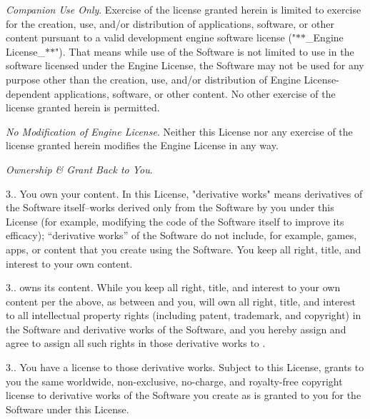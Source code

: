 \begin{DoxyEnumerate}
\item {\itshape {} Companion Use Only}. Exercise of the license granted herein is limited to exercise for the creation, use, and/or distribution of applications, software, or other content pursuant to a valid  development engine software license ("{}\texorpdfstring{$\ast$}{*}\texorpdfstring{$\ast$}{*}\+\_\+\+Engine License\+\_\+\texorpdfstring{$\ast$}{*}\texorpdfstring{$\ast$}{*}"{}). That means while use of the Software is not limited to use in the software licensed under the Engine License, the Software may not be used for any purpose other than the creation, use, and/or distribution of Engine License-\/dependent applications, software, or other content. No other exercise of the license granted herein is permitted.
\end{DoxyEnumerate}
\begin{DoxyEnumerate}
\item {\itshape No Modification of Engine License}. Neither this License nor any exercise of the license granted herein modifies the Engine License in any way.
\end{DoxyEnumerate}
\begin{DoxyEnumerate}
\item {\itshape Ownership \& Grant Back to You}.

3.. You own your content. In this License, "{}derivative works"{} means derivatives of the Software itself--works derived only from the Software by you under this License (for example, modifying the code of the Software itself to improve its efficacy); “derivative works” of the Software do not include, for example, games, apps, or content that you create using the Software. You keep all right, title, and interest to your own content.

3..  owns its content. While you keep all right, title, and interest to your own content per the above, as between  and you,  will own all right, title, and interest to all intellectual property rights (including patent, trademark, and copyright) in the Software and derivative works of the Software, and you hereby assign and agree to assign all such rights in those derivative works to .

3.. You have a license to those derivative works. Subject to this License,  grants to you the same worldwide, non-\/exclusive, no-\/charge, and royalty-\/free copyright license to derivative works of the Software you create as is granted to you for the Software under this License.
\end{DoxyEnumerate}
